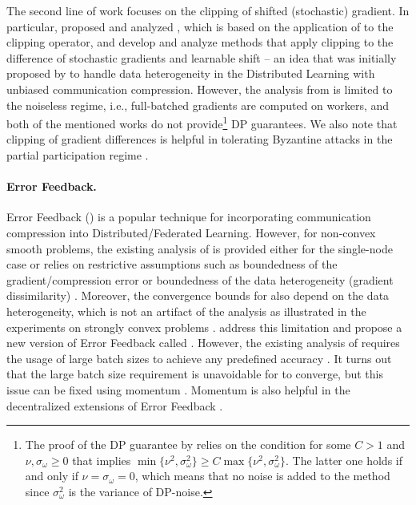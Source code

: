 \documentclass[a4paper,11pt]{article}
\begin{document}
The second line of work focuses on the clipping of shifted (stochastic) gradient. In particular, \citet{khirirat2023clip21} proposed and analyzed , which is based on the application of  \citep{richtarik2021ef21} to the clipping operator, and \citet{gorbunov2024high} develop and analyze methods that apply clipping to the difference of stochastic gradients and learnable shift -- an idea that was initially proposed by \citet{mishchenko2019distributed} to handle data heterogeneity in the Distributed Learning with unbiased communication compression. However, the analysis from \citep{khirirat2023clip21} is limited to the noiseless regime, i.e., full-batched gradients are computed on workers, and both of the mentioned works do not provide\footnote{The proof of the DP guarantee by \citet{khirirat2023clip21} relies on the condition for some $C > 1$ and $\nu, \sigma_\omega \geq 0$ that implies $\min\{\nu^2, \sigma_\omega^2\} \geq C \max\{\nu^2, \sigma_\omega^2\}$. The latter one holds if and only if $\nu = \sigma_\omega = 0$, which means that no noise is added to the method since $\sigma_\omega^2$ is the variance of DP-noise.} DP guarantees. We also note that clipping of gradient differences is helpful in tolerating Byzantine attacks in the partial participation regime \citep{malinovsky2023byzantine}.



\paragraph{Error Feedback.} Error Feedback () \citep{seide20141} is a popular technique for incorporating communication compression into Distributed/Federated Learning. However, for non-convex smooth problems, the existing analysis of  is provided either for the single-node case or relies on restrictive assumptions such as boundedness of the gradient/compression error or boundedness of the data heterogeneity (gradient dissimilarity) \citep{stich2018sparsified, stich2019error, karimireddy2019error, koloskova2019decentralized, beznosikov2023biased, tang2019doublesqueeze, xie2020cser, sahu2021rethinking}. Moreover, the convergence bounds for  also depend on the data heterogeneity, which is not an artifact of the analysis as illustrated in the experiments on strongly convex problems \citet{gorbunov2020linearly}. \citet{richtarik2021ef21} address this limitation and propose a new version of Error Feedback called . However, the existing analysis of  requires the usage of large batch sizes to achieve any predefined accuracy \citep{fatkhullin2021ef21}. It turns out that the large batch size requirement is unavoidable for  to converge, but this issue can be fixed using momentum \citep{fatkhullin2024momentum}. Momentum is also helpful in the decentralized extensions of Error Feedback \citep{yau2022docom, huang2023stochastic, islamov2024near}.
\end{document}
